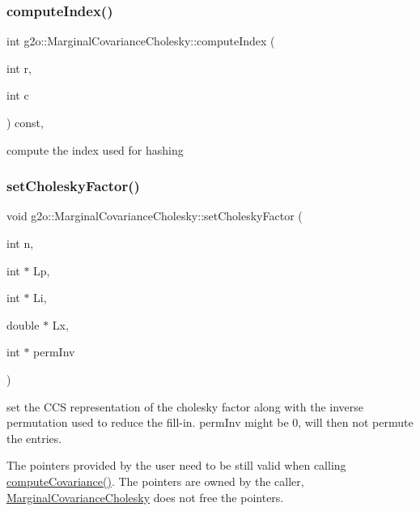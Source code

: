 \subsubsection{\texorpdfstring{compute\+Index()}{computeIndex()}}
{\footnotesize\ttfamily int g2o\+::\+Marginal\+Covariance\+Cholesky\+::compute\+Index (\begin{DoxyParamCaption}\item[{int}]{r,  }\item[{int}]{c }\end{DoxyParamCaption}) const\hspace{0.3cm}{\ttfamily [inline]}, {\ttfamily [protected]}}



compute the index used for hashing 

\mbox{\label{classg2o_1_1_marginal_covariance_cholesky_a53bda8bc29bee2a7fb871c25a58ab191}} 
\subsubsection{\texorpdfstring{set\+Cholesky\+Factor()}{setCholeskyFactor()}}
{\footnotesize\ttfamily void g2o\+::\+Marginal\+Covariance\+Cholesky\+::set\+Cholesky\+Factor (\begin{DoxyParamCaption}\item[{int}]{n,  }\item[{int $\ast$}]{Lp,  }\item[{int $\ast$}]{Li,  }\item[{double $\ast$}]{Lx,  }\item[{int $\ast$}]{perm\+Inv }\end{DoxyParamCaption})}

set the C\+CS representation of the cholesky factor along with the inverse permutation used to reduce the fill-\/in. perm\+Inv might be 0, will then not permute the entries.

The pointers provided by the user need to be still valid when calling \mbox{\hyperlink{classg2o_1_1_marginal_covariance_cholesky_a0ea50dbda0558ca98faacafc8c9f48c9}{compute\+Covariance()}}. The pointers are owned by the caller, \mbox{\hyperlink{classg2o_1_1_marginal_covariance_cholesky}{Marginal\+Covariance\+Cholesky}} does not free the pointers. 

